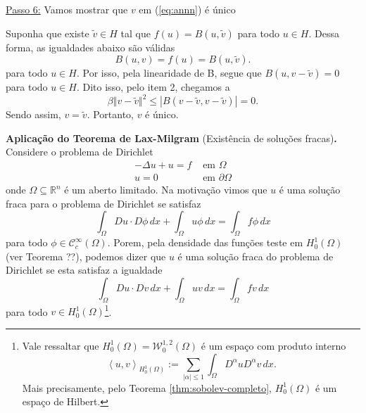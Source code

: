 \documentclass[a4paper, 11pt]{book}
\theoremstyle{definition}
\newcommand{\bR}{\mathbb{R}}
\newcommand{\cC}{\mathcal{C}}
\newcommand{\cW}{\mathcal{W}}
\begin{document}
\begin{prf}
    \underline{Passo 6:} Vamos mostrar que $v$ em (\ref{eq:annn}) é único

    Suponha que existe $\tilde v \in H$ tal que $f(u) = B(u, \tilde v)$ para todo $u \in H$.
    Dessa forma, as igualdades abaixo são válidas
    \[
        B(u,v) = f(u) = B(u,\tilde v).
    \]
    para todo $u \in H$.
    Por isso, pela linearidade de B, segue que $B(u, v - \tilde v) = 0$ para todo $u \in H$.
    Dito isso, pelo item 2, chegamos a
    \[
        \beta \Vert v - \tilde v \Vert^2 \leqslant | B(v - \tilde v, v - \tilde v) | = 0.
    \]
    Sendo assim, $v = \tilde v$.
    Portanto, $v$ é único.
\end{prf}

\noindent\textbf{Aplicação do Teorema de Lax-Milgram} (Existência de soluções fracas)\textbf{.} Considere o problema de Dirichlet
\begin{equation} \label{eq:problema-de-dirichlet}
    \begin{aligned}
        -\Delta u + u = f &\text{ em } \Omega\\
        u = 0 &\text{ em } \partial\Omega
    \end{aligned}
\end{equation}
onde $\Omega \subseteq \bR^n$ é um aberto limitado.
Na motivação vimos que $u$ é uma solução fraca para o problema de Dirichlet se satisfaz
\[
    \int_\Omega Du \cdot D\phi \,dx + \int_\Omega u\phi \,dx = \int_\Omega f\phi \,dx
\]
para todo $\phi \in \cC^{\infty}_c(\Omega)$.
Porem, pela densidade das funções teste em $H^{1}_0(\Omega)$ (ver Teorema ??), podemos dizer que $u$ é uma solução fraca do problema de Dirichlet se esta satisfaz a igualdade
\[
    \int_\Omega Du \cdot Dv \,dx + \int_\Omega uv \,dx = \int_\Omega fv \,dx
\]
para todo $v \in H_0^1(\Omega)$\footnote{Vale ressaltar que $H_0^1(\Omega) = \cW^{1,2}_0(\Omega)$ é um espaço com produto interno
\[
    \left\langle u, v \right\rangle _{H^1_0(\Omega)} := \sum_{|\alpha| \leqslant 1}\int_\Omega D^\alpha u D^\alpha v \,dx.
\]
Mais precisamente, pelo Teorema \ref{thm:sobolev-completo}, $H^1_0(\Omega)$ é um espaço de Hilbert.
}.
\end{document}
